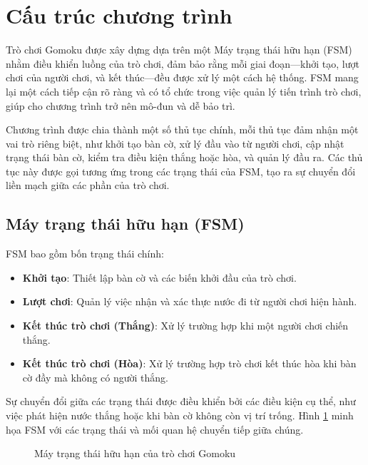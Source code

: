 \section{Cấu trúc chương trình}
Trò chơi Gomoku được xây dựng dựa trên một Máy trạng thái hữu hạn (FSM) nhằm điều khiển luồng của trò chơi, đảm bảo rằng mỗi giai đoạn—khởi tạo, lượt chơi của người chơi, và kết thúc—đều được xử lý một cách hệ thống. FSM mang lại một cách tiếp cận rõ ràng và có tổ chức trong việc quản lý tiến trình trò chơi, giúp cho chương trình trở nên mô-đun và dễ bảo trì.

Chương trình được chia thành một số thủ tục chính, mỗi thủ tục đảm nhận một vai trò riêng biệt, như khởi tạo bàn cờ, xử lý đầu vào từ người chơi, cập nhật trạng thái bàn cờ, kiểm tra điều kiện thắng hoặc hòa, và quản lý đầu ra. Các thủ tục này được gọi tương ứng trong các trạng thái của FSM, tạo ra sự chuyển đổi liền mạch giữa các phần của trò chơi.

\subsection{Máy trạng thái hữu hạn (FSM)}
FSM bao gồm bốn trạng thái chính:

\begin{itemize}
    \item \textbf{Khởi tạo}: Thiết lập bàn cờ và các biến khởi đầu của trò chơi.
    \item \textbf{Lượt chơi}: Quản lý việc nhận và xác thực nước đi từ người chơi hiện hành.
    \item \textbf{Kết thúc trò chơi (Thắng)}: Xử lý trường hợp khi một người chơi chiến thắng.
    \item \textbf{Kết thúc trò chơi (Hòa)}: Xử lý trường hợp trò chơi kết thúc hòa khi bàn cờ đầy mà không có người thắng.
\end{itemize}

Sự chuyển đổi giữa các trạng thái được điều khiển bởi các điều kiện cụ thể, như việc phát hiện nước thắng hoặc khi bàn cờ không còn vị trí trống. Hình \ref{fig:fsm} minh họa FSM với các trạng thái và mối quan hệ chuyển tiếp giữa chúng.

\begin{figure}[!htbp]
    \centering
    
    \caption{Máy trạng thái hữu hạn của trò chơi Gomoku}
    \label{fig:fsm}
\end{figure}

